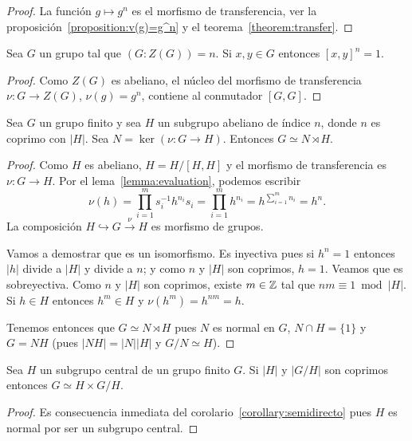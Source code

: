 \begin{proof}
	La función $g\mapsto g^n$ es el morfismo de transferencia, ver la
	proposición~\ref{proposition:v(g)=g^n} y el teorema~\ref{theorem:transfer}.
\end{proof}

\begin{corollary}
	\label{corollary:[x,y]^n=1}
	Sea $G$ un grupo tal que $(G:Z(G))=n$. Si $x,y\in G$ entonces $[x,y]^n=1$. 
\end{corollary}

\begin{proof}
	Como $Z(G)$ es abeliano, el núcleo del morfismo de transferencia $\nu\colon
	G\to Z(G)$, $\nu(g)=g^n$, contiene al conmutador $[G,G]$.
\end{proof}

\begin{corollary}
	\label{corollary:semidirecto}
	Sea $G$ un grupo finito y sea $H$ un subgrupo abeliano de
	índice $n$, donde $n$ es coprimo con $|H|$.  Sea
	$N=\ker(\nu\colon G\to H)$. Entonces $G\simeq N\rtimes H$.
\end{corollary}


\begin{proof}
	Como $H$ es abeliano, $H=H/[H,H]$ y el morfismo de transferencia es
	$\nu\colon G\to H$. Por el lema~\ref{lemma:evaluation}, podemos escribir
	\[
		\nu(h)
		=\prod_{i=1}^m s_i^{-1}h^{n_i}s_i
		=\prod_{i=1}^m h^{n_i}
		=h^{\sum_{i=1}^m n_i}=h^n.
	\]
	La composición $H\hookrightarrow G\xrightarrow{\nu} H$ es morfismo de
	grupos. 
	
	Vamos a demostrar que es un isomorfismo. Es inyectiva pues si $h^n=1$
	entonces $|h|$ divide a $|H|$ y divide a $n$; y como $n$ y $|H|$ son
	coprimos, $h=1$. Veamos que es sobreyectiva. Como $n$ y $|H|$ son coprimos,
	existe $m\in\mathbb{Z}$ tal que $nm\equiv 1\bmod |H|$. Si $h\in H$ entonces $h^m\in
	H$ y $\nu(h^m)=h^{nm}=h$. 

	Tenemos entonces que $G\simeq N\rtimes H$ pues $N$ es normal en $G$, $N\cap
	H=\{1\}$ y $G=NH$ (pues $|NH|=|N||H|$ y $G/N\simeq H$).
\end{proof}

\begin{corollary}[Frobenius]
	Sea $H$ un subgrupo central de un grupo finito $G$. Si $|H|$
	y $|G/H|$ son coprimos entonces $G\simeq H\times G/H$.
\end{corollary}

\begin{proof}
	Es consecuencia inmediata del corolario~\ref{corollary:semidirecto} pues
	$H$ es normal por ser un subgrupo central.
\end{proof}

